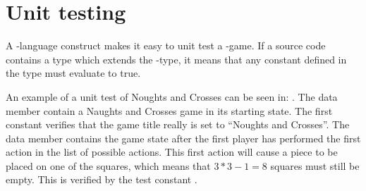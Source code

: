 

\section{Unit testing}
A \productname{}-language construct makes it easy to unit test a \productname{}-game.
If a source code contains a type which extends the -type, it means that any constant defined in the type must evaluate to true.

An example of a unit test of Noughts and Crosses can be seen in:
.
The data member  contain a Naughts and Crosses game in its starting state.
The first constant  verifies that the game title really is set to ``Noughts and Crosses''.
The data member  contains the game state after the first player has 
performed the first action in the list of possible actions. This first action will cause a piece to be placed on one of the squares, which means 
that $3*3 - 1 = 8$ squares must still be empty. This is verified by the test constant .

